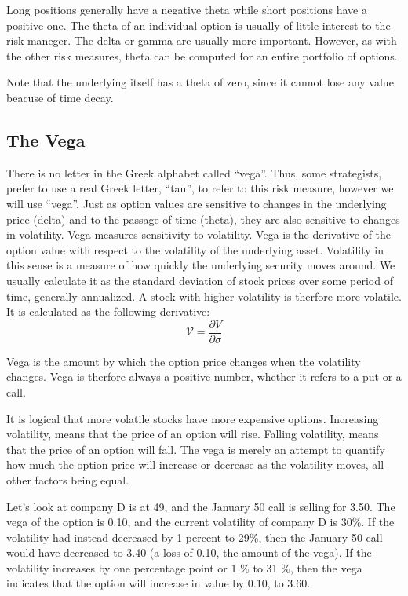 \documentclass[a4paper, 12pt]{article}
\theoremstyle{definition}
\theoremstyle{plain}
\theoremstyle{definition}
\begin{document}
Long positions generally have a negative theta while 
short positions have a positive one. 
The theta of an individual option is usually of little interest to the risk maneger.
The delta or gamma are usually more important. However, as with the
other risk measures, theta can be computed for an entire portfolio of options.

Note that the underlying itself has a 
theta of zero, since it cannot lose any value beacuse of time decay. 

\subsection{The Vega}

There is no letter in the Greek alphabet called ``vega''.
Thus, some strategists, prefer to use a real Greek letter, 
``tau'', to refer to this risk measure, however 
we will use ``vega''.
Just as option values are sensitive to changes in the underlying price (delta) and
to the passage of time (theta), they are also sensitive to changes in volatility. 
Vega measures sensitivity to volatility. 
Vega is the derivative of the option value with respect to the volatility of the underlying asset.
Volatility in this sense is a measure of how quickly the underlying security moves around. 
We usually calculate it as the standard deviation of stock prices over some
period of time, generally annualized.
A stock with higher volatility is therfore more volatile.
It is calculated as the following derivative:
$$ 
\mathcal{V}  = \frac{\partial V}{\partial \sigma}
$$


Vega is the amount by which the option price changes when the
volatility changes. Vega is therfore always a positive number, whether it refers to
a put or a call. 

It is logical that more volatile stocks have more expensive options. 
Increasing volatility, means that the price of an option will rise. 
Falling volatility, means that the price of an option will fall. 
The vega is merely an attempt to quantify how much the
option price will increase or decrease as the volatility moves, 
all other factors being equal. 

Let's look at company D is at 49, and the January 50 call is selling for 3.50. The
vega of the option is 0.10, and the current volatility of company D is 30\%.
If the volatility had instead decreased by 1 percent to 29\%, then the January 50
call would have decreased to 3.40 (a loss of 0.10, the amount of the vega).
If the volatility increases by one percentage point or 1 \% to 31 \%, then the vega
indicates that the option will increase in value by 0.10, to 3.60. 
\end{document}
